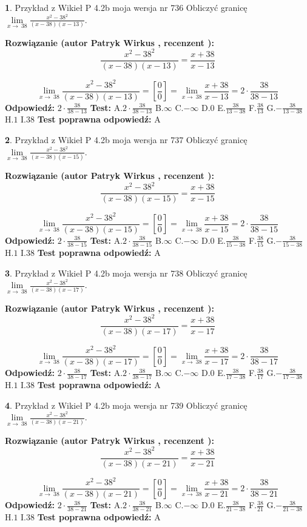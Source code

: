 \documentclass[12pt, a4paper]{article}
\theoremstyle{definition} %
\newtheorem{zad}{}
\newcommand{\zadStart}[1]{\begin{zad}#1\newline}
\newcommand{\zadStop}{\end{zad}}
\newcommand{\rozwStart}[2]{\noindent \textbf{Rozwiązanie (autor #1 , recenzent #2): }\newline}
\newcommand{\rozwStop}{\newline}
\newcommand{\odpStart}{\noindent \textbf{Odpowiedź:}\newline}
\newcommand{\odpStop}{\newline}
\newcommand{\testStart}{\noindent \textbf{Test:}\newline}
\newcommand{\testStop}{\newline}
\newcommand{\kluczStart}{\noindent \textbf{Test poprawna odpowiedź:}\newline}
\newcommand{\kluczStop}{\newline}
\begin{document}
\zadStart{Przykład z Wikieł P 4.2b moja wersja nr 736}
Obliczyć granicę $\lim\limits_{x\to\ 38}\frac{x^{2}-38^{2}}{(x-38)(x-13)}$.
\zadStop
\rozwStart{Patryk Wirkus}{}
$$\frac{x^{2}-38^{2}}{(x-38)(x-13)}=\frac{x+38}{x-13}$$

$$\lim\limits_{x\to\ 38}\frac{x^{2}-38^{2}}{(x-38)(x-13)}=[\frac{0}{0}]=\lim\limits_{x\to\ 38}\frac{x+38}{x-13}=2 \cdot \frac{38}{38-13}$$
\rozwStop
\odpStart
$2 \cdot \frac{38}{38-13}$
\odpStop
\testStart
A.$2 \cdot \frac{38}{38-13}$
B.$\infty$
C.$-\infty$
D.$0$
E.$\frac{38}{13-38}$
F.$\frac{38}{13}$
G.$-\frac{38}{13-38}$
H.$1$
I.$38$
\testStop
\kluczStart
A
\kluczStop



\zadStart{Przykład z Wikieł P 4.2b moja wersja nr 737}
Obliczyć granicę $\lim\limits_{x\to\ 38}\frac{x^{2}-38^{2}}{(x-38)(x-15)}$.
\zadStop
\rozwStart{Patryk Wirkus}{}
$$\frac{x^{2}-38^{2}}{(x-38)(x-15)}=\frac{x+38}{x-15}$$

$$\lim\limits_{x\to\ 38}\frac{x^{2}-38^{2}}{(x-38)(x-15)}=[\frac{0}{0}]=\lim\limits_{x\to\ 38}\frac{x+38}{x-15}=2 \cdot \frac{38}{38-15}$$
\rozwStop
\odpStart
$2 \cdot \frac{38}{38-15}$
\odpStop
\testStart
A.$2 \cdot \frac{38}{38-15}$
B.$\infty$
C.$-\infty$
D.$0$
E.$\frac{38}{15-38}$
F.$\frac{38}{15}$
G.$-\frac{38}{15-38}$
H.$1$
I.$38$
\testStop
\kluczStart
A
\kluczStop



\zadStart{Przykład z Wikieł P 4.2b moja wersja nr 738}
Obliczyć granicę $\lim\limits_{x\to\ 38}\frac{x^{2}-38^{2}}{(x-38)(x-17)}$.
\zadStop
\rozwStart{Patryk Wirkus}{}
$$\frac{x^{2}-38^{2}}{(x-38)(x-17)}=\frac{x+38}{x-17}$$

$$\lim\limits_{x\to\ 38}\frac{x^{2}-38^{2}}{(x-38)(x-17)}=[\frac{0}{0}]=\lim\limits_{x\to\ 38}\frac{x+38}{x-17}=2 \cdot \frac{38}{38-17}$$
\rozwStop
\odpStart
$2 \cdot \frac{38}{38-17}$
\odpStop
\testStart
A.$2 \cdot \frac{38}{38-17}$
B.$\infty$
C.$-\infty$
D.$0$
E.$\frac{38}{17-38}$
F.$\frac{38}{17}$
G.$-\frac{38}{17-38}$
H.$1$
I.$38$
\testStop
\kluczStart
A
\kluczStop



\zadStart{Przykład z Wikieł P 4.2b moja wersja nr 739}
Obliczyć granicę $\lim\limits_{x\to\ 38}\frac{x^{2}-38^{2}}{(x-38)(x-21)}$.
\zadStop
\rozwStart{Patryk Wirkus}{}
$$\frac{x^{2}-38^{2}}{(x-38)(x-21)}=\frac{x+38}{x-21}$$

$$\lim\limits_{x\to\ 38}\frac{x^{2}-38^{2}}{(x-38)(x-21)}=[\frac{0}{0}]=\lim\limits_{x\to\ 38}\frac{x+38}{x-21}=2 \cdot \frac{38}{38-21}$$
\rozwStop
\odpStart
$2 \cdot \frac{38}{38-21}$
\odpStop
\testStart
A.$2 \cdot \frac{38}{38-21}$
B.$\infty$
C.$-\infty$
D.$0$
E.$\frac{38}{21-38}$
F.$\frac{38}{21}$
G.$-\frac{38}{21-38}$
H.$1$
I.$38$
\testStop
\kluczStart
A
\kluczStop
\end{document}
